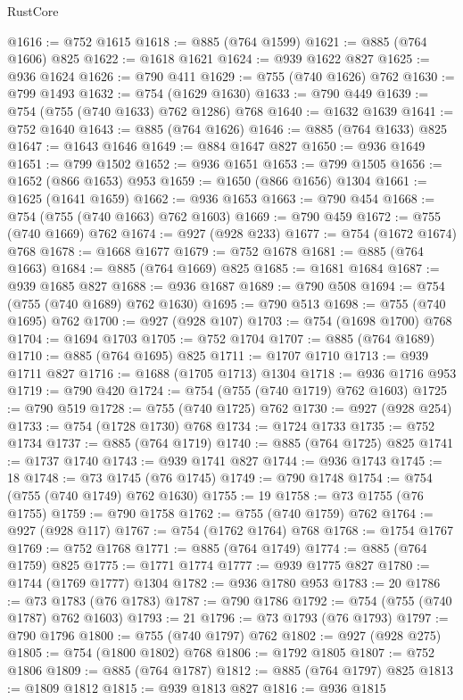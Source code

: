 \begin{lexlean}{RustCore}
\begin{coremodule}
@1616 := @752 @1615
@1618 := @885 (@764 @1599)
@1621 := @885 (@764 @1606) @825
@1622 := @1618 @1621
@1624 := @939 @1622 @827
@1625 := @936 @1624
@1626 := @790 @411
@1629 := @755 (@740 @1626) @762
@1630 := @799 @1493
@1632 := @754 (@1629 @1630)
@1633 := @790 @449
@1639 := @754 (@755 (@740 @1633) @762 @1286) @768
@1640 := @1632 @1639
@1641 := @752 @1640
@1643 := @885 (@764 @1626)
@1646 := @885 (@764 @1633) @825
@1647 := @1643 @1646
@1649 := @884 @1647 @827
@1650 := @936 @1649
@1651 := @799 @1502
@1652 := @936 @1651
@1653 := @799 @1505
@1656 := @1652 (@866 @1653) @953
@1659 := @1650 (@866 @1656) @1304
@1661 := @1625 (@1641 @1659)
@1662 := @936 @1653
@1663 := @790 @454
@1668 := @754 (@755 (@740 @1663) @762 @1603)
@1669 := @790 @459
@1672 := @755 (@740 @1669) @762
@1674 := @927 (@928 @233)
@1677 := @754 (@1672 @1674) @768
@1678 := @1668 @1677
@1679 := @752 @1678
@1681 := @885 (@764 @1663)
@1684 := @885 (@764 @1669) @825
@1685 := @1681 @1684
@1687 := @939 @1685 @827
@1688 := @936 @1687
@1689 := @790 @508
@1694 := @754 (@755 (@740 @1689) @762 @1630)
@1695 := @790 @513
@1698 := @755 (@740 @1695) @762
@1700 := @927 (@928 @107)
@1703 := @754 (@1698 @1700) @768
@1704 := @1694 @1703
@1705 := @752 @1704
@1707 := @885 (@764 @1689)
@1710 := @885 (@764 @1695) @825
@1711 := @1707 @1710
@1713 := @939 @1711 @827
@1716 := @1688 (@1705 @1713) @1304
@1718 := @936 @1716 @953
@1719 := @790 @420
@1724 := @754 (@755 (@740 @1719) @762 @1603)
@1725 := @790 @519
@1728 := @755 (@740 @1725) @762
@1730 := @927 (@928 @254)
@1733 := @754 (@1728 @1730) @768
@1734 := @1724 @1733
@1735 := @752 @1734
@1737 := @885 (@764 @1719)
@1740 := @885 (@764 @1725) @825
@1741 := @1737 @1740
@1743 := @939 @1741 @827
@1744 := @936 @1743
@1745 := 18
@1748 := @73 @1745 (@76 @1745)
@1749 := @790 @1748
@1754 := @754 (@755 (@740 @1749) @762 @1630)
@1755 := 19
@1758 := @73 @1755 (@76 @1755)
@1759 := @790 @1758
@1762 := @755 (@740 @1759) @762
@1764 := @927 (@928 @117)
@1767 := @754 (@1762 @1764) @768
@1768 := @1754 @1767
@1769 := @752 @1768
@1771 := @885 (@764 @1749)
@1774 := @885 (@764 @1759) @825
@1775 := @1771 @1774
@1777 := @939 @1775 @827
@1780 := @1744 (@1769 @1777) @1304
@1782 := @936 @1780 @953
@1783 := 20
@1786 := @73 @1783 (@76 @1783)
@1787 := @790 @1786
@1792 := @754 (@755 (@740 @1787) @762 @1603)
@1793 := 21
@1796 := @73 @1793 (@76 @1793)
@1797 := @790 @1796
@1800 := @755 (@740 @1797) @762
@1802 := @927 (@928 @275)
@1805 := @754 (@1800 @1802) @768
@1806 := @1792 @1805
@1807 := @752 @1806
@1809 := @885 (@764 @1787)
@1812 := @885 (@764 @1797) @825
@1813 := @1809 @1812
@1815 := @939 @1813 @827
@1816 := @936 @1815

\end{coremodule}
\end{lexlean}
